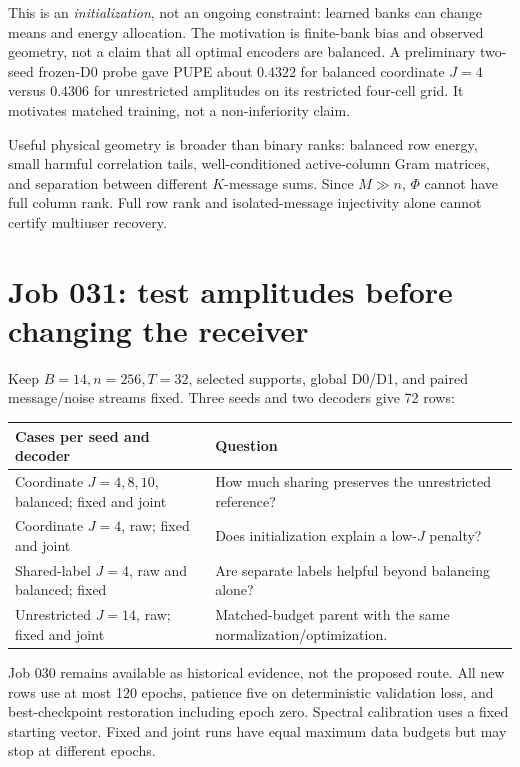 \documentclass[11pt]{article}
\begin{document}
This is an \emph{initialization}, not an ongoing constraint: learned banks can change means and energy allocation.
The motivation is finite-bank bias and observed geometry, not a claim that all optimal encoders are balanced.
A preliminary two-seed frozen-D0 probe gave PUPE about $0.4322$ for balanced coordinate $J=4$ versus $0.4306$
for unrestricted amplitudes on its restricted four-cell grid. It motivates matched training, not a non-inferiority claim.

Useful physical geometry is broader than binary ranks: balanced row energy, small harmful correlation tails,
well-conditioned active-column Gram matrices, and separation between different $K$-message sums.
Since $M\gg n$, $\Phi$ cannot have full column rank. Full row rank and isolated-message injectivity alone cannot
certify multiuser recovery.

\newpage
\section{Job 031: test amplitudes before changing the receiver}

Keep $B=14,n=256,T=32$, selected supports, global D0/D1, and paired message/noise streams fixed.
Three seeds and two decoders give 72 rows:
\begin{center}
\small
\begin{tabularx}{\textwidth}{@{}p{}Y@{}}
\toprule
Cases per seed and decoder & Question \\
\midrule
Coordinate $J=4,8,10$, balanced; fixed and joint & How much sharing preserves the unrestricted reference? \\
Coordinate $J=4$, raw; fixed and joint & Does initialization explain a low-$J$ penalty? \\
Shared-label $J=4$, raw and balanced; fixed & Are separate labels helpful beyond balancing alone? \\
Unrestricted $J=14$, raw; fixed and joint & Matched-budget parent with the same normalization/optimization. \\
\bottomrule
\end{tabularx}
\end{center}
Job 030 remains available as historical evidence, not the proposed route. All new rows use at most 120 epochs,
patience five on deterministic validation loss, and best-checkpoint restoration including epoch zero.
Spectral calibration uses a fixed starting vector. Fixed and joint runs have equal maximum data budgets but may
stop at different epochs.
\end{document}
